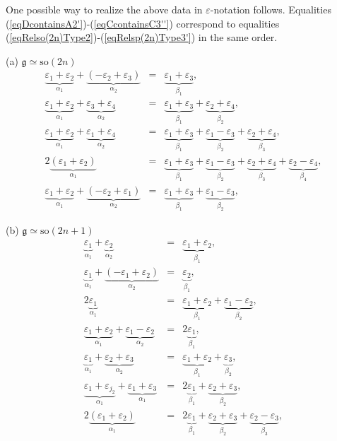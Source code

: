 \documentclass[12pt]{report}
\newcommand{\gG}{\mathfrak{g}}
\newcommand{\so}{\mathrm{so}}
\newcommand{\eps}{\varepsilon}
\begin{document}
One possible way to realize the above data in $\eps$-notation follows. Equalities (\ref{eqDcontainsA2'})-(\ref{eqCcontainsC3''}) correspond to equalities (\ref{eqRelso(2n)Type2})-(\ref{eqRelsp(2n)Type3'}) in the same order.

\smallskip \noindent (a) $\gG\simeq\so(2n)$
\begin{eqnarray}
\underbrace{\eps_{1}+\eps_{2}}_{\alpha_1}+\underbrace{(- \eps_{2}+\eps_{3})}_{\alpha_2} &=& \underbrace{\eps_{1}+\eps_{3}}_{\beta_1},\label{eqRelso(2n)Type2}\\
\label{eqRelso(2n)Type1}
\underbrace{\eps_{1}+\eps_{2}}_{\alpha_1}+\underbrace{\eps_{3}+\eps_{4}}_{\alpha_2}  &=& \underbrace{ \eps_{1}+ \eps_{3}}_{\beta_1}+ \underbrace{\eps_{2}+\eps_{4}}_{\beta_2},\\
\label{eqRelso(2n)Type1'}
\underbrace{\eps_{1}+\eps_{2}}_{\alpha_1}+\underbrace{ \eps_{1}+\eps_{4}}_{\alpha_2}&=& \underbrace{  \eps_{1}+ \eps_{3}}_{\beta_1} + \underbrace{\eps_{1}- \eps_{3}  }_{\beta_2} +  \underbrace{\eps_{2 }+ \eps_{4}  }_{\beta_3},\\
\label{eqRelso(2n)Type1''}
2\underbrace{(\eps_{1}+\eps_{2})}_{\alpha_1}&=&
\underbrace{\eps_{1}+\eps_{3}}_{\beta_1}+\underbrace{\eps_{1}  -\eps_{3}}_{\beta_2} + \underbrace{\eps_{2} + \eps_{4} }_{\beta_3} +\underbrace{\eps_{2}- \eps_{4} }_{\beta_4},\\
\underbrace{\eps_{1}+\eps_{2}}_{\alpha_1}+ \underbrace{(-\eps_{2}+\eps_{1})}_{\alpha_2}&=&\label{eqRelso(2n)Type3} \underbrace{\eps_{1} +\eps_{3}}_{\beta_1} + \underbrace{\eps_{1}-\eps_{3}}_{\beta_2},
\end{eqnarray}

\smallskip \noindent (b) $\gG\simeq\so(2n+1)$
\begin{eqnarray}
\label{eqRelso(2n+1)Type1}
\underbrace{\eps_{1}}_{\alpha_1}+\underbrace{\eps_{2}}_{\alpha_2}&=& \underbrace{ \eps_{1} +\eps_{2} }_{\beta_1},\\
\label{eqRelso(2n+1)Type1'}
\underbrace{\eps_{1}}_{\alpha_1}+\underbrace{(-\eps_{1}+ \eps_{2})}_{\alpha_2}&=& \underbrace{ \eps_{2} }_{\beta_1},\\
\label{eqRelso(2n+1)Type3}
2\underbrace{\eps_{1}}_{\alpha_1}&=& \underbrace{ \eps_{ 1}+\eps_{2} }_{\beta_1}+  \underbrace{ \eps_{ 1}-\eps_{2} }_{\beta_2},\\
\label{eqRelso(2n+1)Type3.5}
\underbrace{\eps_{ 1}+\eps_{2} }_{\alpha_1}+  \underbrace{ \eps_{ 1}-\eps_{2} }_{\alpha_2}&=&2\underbrace{\eps_{1}}_{\beta_1},\\
\label{eqRelso(2n+1)Type2}
\underbrace{\eps_{1}}_{\alpha_1}+\underbrace{\eps_{2}+ \eps_{3}}_{\alpha_2}&=& \underbrace{\eps_{ 1}+\eps_{2} }_{\beta_1}+ \underbrace{ \eps_{3 }}_{\beta_2},\\
\label{eqRelso(2n+1)Type4}
\underbrace{\eps_{1}+\eps_{j_2}}_{\alpha_1}+\underbrace{\eps_{1}+ \eps_{3}}_{\alpha_1}&=& 2\underbrace{ \eps_{ 1} }_{\beta_1}+ \underbrace{ \eps_{ 2}+\eps_{3} }_{\beta_2},\\
\label{eqRelso(2n+1)Type5}
2\underbrace{(\eps_{1}+ \eps_{2})}_{\alpha_1}&=& 2\underbrace{ \eps_{ 1} }_{\beta_1}+\underbrace{\eps_{ 2}+\eps_{3} }_{\beta_2}+ \underbrace{ \eps_{ 2}-\eps_{3} }_{\beta_3} ,
\end{eqnarray}
\end{document}
